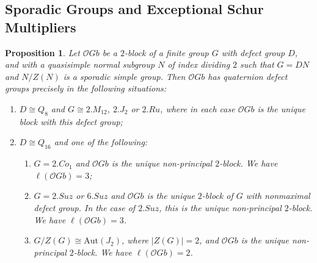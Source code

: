 \documentclass{amsart}
\theoremstyle{plain}\newtheorem{Theorem}{Theorem}[section]
\theoremstyle{plain}\newtheorem{Conjecture}[Theorem]{Conjecture}
\theoremstyle{plain}\newtheorem{Corollary}[Theorem]{Corollary}
\theoremstyle{plain}\newtheorem{Lemma}[Theorem]{Lemma}
\theoremstyle{plain}\newtheorem{Proposition}[Theorem]{Proposition}
\theoremstyle{definition}\newtheorem{Definition}[Theorem]{Definition}
\theoremstyle{definition}\newtheorem{Example}[Theorem]{Example}
\theoremstyle{definition}\newtheorem{Examples}[Theorem]{Examples}
\theoremstyle{definition}\newtheorem{Exercise}[Theorem]{Exercise}
\theoremstyle{definition}\newtheorem{Notation}[Theorem]{Notation}
\theoremstyle{definition}\newtheorem{Remark}[Theorem]{Remark}
\theoremstyle{definition}\newtheorem{Remarks}[Theorem]{Remarks}
\def\CO{{\mathcal{O}}}    \def\OPE{{\mathcal{O}(P\rtimes E)}}
\def\Aut{\mathrm{Aut}}               \def\tenk{\otimes_k}
\newcommand{\zent} {Z}
\numberwithin{equation}{section}
\begin{document}
\subsection{Sporadic Groups and Exceptional Schur Multipliers} \label{sporadic}
\begin{Proposition}\label{prop:sporadicgenquat}
   Let $\CO Gb$ be a $2$-block of a finite group $G$ with defect group $D$, and with a quasisimple normal subgroup $N$ of index dividing $2$ such that $G=DN$ and $N/\zent(N)$ is a sporadic simple group. Then $\CO Gb$ has quaternion defect groups precisely in the following situations:
   \begin{enumerate}
       \item $D \cong Q_8$ and $G \cong 2.M_{12}$, $2.J_2$ or $2.Ru$, where in each case $\CO Gb$ is the unique block with this defect group;
       \item $D \cong Q_{16}$ and one of the following:
       \begin{enumerate}
           \item $G=2.Co_1$ and $\CO Gb$ is the unique non-principal $2$-block. We have $\ell(\CO Gb)=3$;
           \item $G=2.Suz$ or $6.Suz$ and $\CO Gb$ is the unique $2$-block of $G$ with nonmaximal defect group. In the case of $2.Suz$, this is the unique non-principal $2$-block. We have $\ell(\CO Gb)=3$.
           \item $G/Z(G) \cong \Aut(J_2)$, where $|Z(G)|=2$, and $\CO Gb$ is the unique non-principal $2$-block. We have $\ell(\CO Gb)=2$.
       \end{enumerate}
   \end{enumerate}
\end{Proposition}
\end{document}
